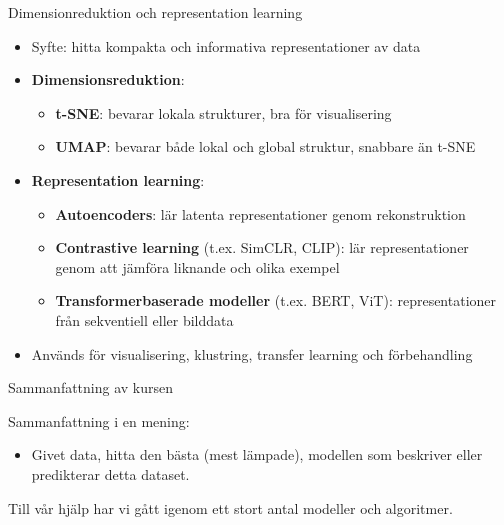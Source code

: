 \documentclass[10pt,english]{beamer}
\begin{document}
\begin{frame}{Dimensionreduktion och representation learning}
  \begin{itemize}
    \item Syfte: hitta kompakta och informativa representationer av data
    \item \textbf{Dimensionsreduktion}:
    \begin{itemize}
      \item \textbf{t-SNE}: bevarar lokala strukturer, bra för visualisering
      \item \textbf{UMAP}: bevarar både lokal och global struktur, snabbare än t-SNE
    \end{itemize}
    \item \textbf{Representation learning}:
    \begin{itemize}
      \item \textbf{Autoencoders}: lär latenta representationer genom rekonstruktion
      \item \textbf{Contrastive learning} (t.ex. SimCLR, CLIP): lär representationer genom att jämföra liknande och olika exempel
      \item \textbf{Transformerbaserade modeller} (t.ex. BERT, ViT): representationer från sekventiell eller bilddata
    \end{itemize}
    \item Används för visualisering, klustring, transfer learning och förbehandling
  \end{itemize}
\end{frame}

\begin{frame}{Sammanfattning av kursen}

    Sammanfattning i en mening:
    \begin{itemize}
        \item Givet data, hitta den bästa (mest lämpade), modellen som beskriver eller predikterar detta dataset.
    \end{itemize}

    Till vår hjälp har vi gått igenom ett stort antal modeller och algoritmer.
    
\end{frame}
\end{document}
